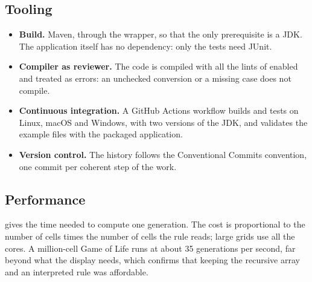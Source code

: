 \subsection{Tooling}

\begin{itemize}
    \item \textbf{Build.} Maven, through the wrapper, so that the only prerequisite is a JDK. The
          application itself has no dependency: only the tests need JUnit.
    \item \textbf{Compiler as reviewer.} The code is compiled with all the lints of 
          enabled and treated as errors: an unchecked conversion or a missing case does not compile.
    \item \textbf{Continuous integration.} A GitHub Actions workflow builds and tests on Linux,
          macOS and Windows, with two versions of the JDK, and validates the example files with the
          packaged application.
    \item \textbf{Version control.} The history follows the Conventional Commits convention, one
          commit per coherent step of the work.
\end{itemize}

\subsection{Performance}

 gives the time needed to compute one generation. The cost is proportional
to the number of cells times the number of cells the rule reads; large grids use all the cores.
A million-cell Game of Life runs at about 35 generations per second, far beyond what the display
needs, which confirms that keeping the recursive array and an interpreted rule was affordable.

